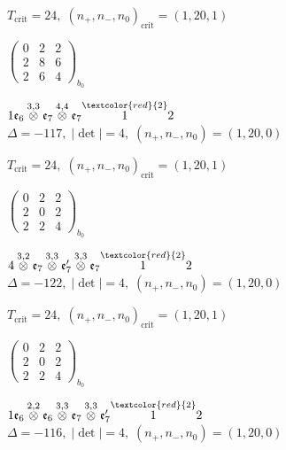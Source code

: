 \documentclass[10pt]{article}
\begin{document}
\hspace{1em}$T_{\text{crit}}=24,\; (n_+,n_-,n_0)_{\text{crit}}=(1,20,1)$

\hspace{2em}$\left(\begin{smallmatrix}0 & 2 & 2 \\ 2 & 8 & 6 \\ 2 & 6 & 4\end{smallmatrix}\right)_{\!b_0}$

\smallskip

$1\mathfrak{e}_6\overset{3,3}{\otimes}\mathfrak{e}_7\overset{4,4}{\otimes}\mathfrak{e}_7\overset{\textcolor{red}{2}}{1}2$ \quad $\Delta=-117,\; |\det|=4,\; (n_+,n_-,n_0)=(1,20,0)$

\hspace{1em}$T_{\text{crit}}=24,\; (n_+,n_-,n_0)_{\text{crit}}=(1,20,1)$

\hspace{2em}$\left(\begin{smallmatrix}0 & 2 & 2 \\ 2 & 0 & 2 \\ 2 & 2 & 4\end{smallmatrix}\right)_{\!b_0}$

\smallskip

$4\overset{3,2}{\otimes}\mathfrak{e}_7\overset{3,3}{\otimes}\mathfrak{e}_7'\overset{3,3}{\otimes}\mathfrak{e}_7\overset{\textcolor{red}{2}}{1}2$ \quad $\Delta=-122,\; |\det|=4,\; (n_+,n_-,n_0)=(1,20,0)$

\hspace{1em}$T_{\text{crit}}=24,\; (n_+,n_-,n_0)_{\text{crit}}=(1,20,1)$

\hspace{2em}$\left(\begin{smallmatrix}0 & 2 & 2 \\ 2 & 0 & 2 \\ 2 & 2 & 4\end{smallmatrix}\right)_{\!b_0}$

\smallskip

$1\mathfrak{e}_6\overset{2,2}{\otimes}\mathfrak{e}_6\overset{3,3}{\otimes}\mathfrak{e}_7\overset{3,3}{\otimes}\mathfrak{e}_7'\overset{\textcolor{red}{2}}{1}2$ \quad $\Delta=-116,\; |\det|=4,\; (n_+,n_-,n_0)=(1,20,0)$
\end{document}
